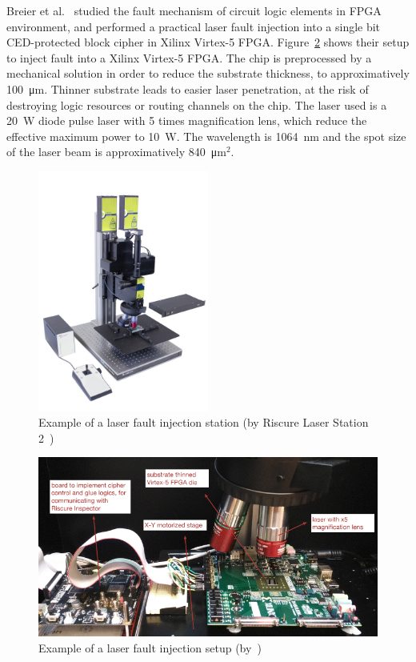 Breier et al.~\cite{JHJBC-17-hss} studied the fault mechanism of circuit logic elements in FPGA environment, and performed a practical laser fault injection into a single bit CED-protected block cipher in Xilinx Virtex-5 FPGA.
Figure~\ref{fig:lfi_setup} shows their setup to inject fault into a Xilinx Virtex-5 FPGA.
The chip is preprocessed by a mechanical solution in order to reduce the substrate thickness, to approximatively \SI{100}{\micro\metre}. Thinner substrate leads to easier laser penetration, at the risk of destroying logic resources or routing channels on the chip.
The laser used is a \SI{20}{\watt} diode pulse laser with 5 times magnification lens, which reduce the effective maximum power to \SI{10}{\watt}. The wavelength is \SI{1064}{\nano\metre} and the spot size of the laser beam is approximatively \SI{840}{\micro\metre}$^2$.

\begin{figure}[ht]
    \centering
    \includegraphics[width=0.5\textwidth]{c2_soa/img/LS2.jpeg}
    \caption{Example of a laser fault injection station (by Riscure Laser Station 2~\cite{riscure_station})}
    \label{fig:ls2}
\end{figure}

\begin{figure}[ht]
    \centering
    \includegraphics[width=\textwidth]{c2_soa/img/lfi_setup.png}
    \caption{Example of a laser fault injection setup (by~\cite{JHJBC-17-hss})}
    \label{fig:lfi_setup}
\end{figure}

